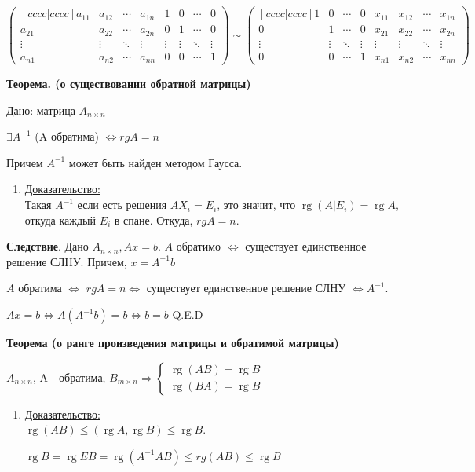 \documentclass[twoside]{book}
\DeclareMathOperator{\rg}{rg}
\newcommand{\prooff}[1]{{\underline{Доказательство:}} \\ }
\begin{document}
\(
\begin{pmatrix}[cccc|cccc]
    a_{11} & a_{12} & \cdots & a_{1n} & 1      & 0      & \cdots & 0      \\
    a_{21} & a_{22} & \cdots & a_{2n} & 0      & 1      & \cdots & 0      \\
    \vdots & \vdots & \ddots & \vdots & \vdots & \vdots & \ddots & \vdots \\
    a_{n1} & a_{n2} & \cdots & a_{nn} & 0      & 0      & \cdots & 1
\end{pmatrix} \sim
\begin{pmatrix}[cccc|cccc]
    1      & 0      & \cdots & 0      & x_{11} & x_{12} & \cdots & x_{1n} \\
    0      & 1      & \cdots & 0      & x_{21} & x_{22} & \cdots & x_{2n} \\
    \vdots & \vdots & \ddots & \vdots & \vdots & \vdots & \ddots & \vdots \\
    0      & 0      & \cdots & 1      & x_{n1} & x_{n2} & \cdots & x_{nn}
\end{pmatrix}
\)

\textbf{Теорема. (о существовании обратной матрицы)}

Дано: матрица \(A_{n \times n}\)

\(\exists A^{-1}\) (A обратима) \(\Leftrightarrow rg A = n\)

Причем \(A^{-1}\) может быть найден методом Гаусса.
\begin{enumerate}
    \item[] \prooff{}
          Такая $A^{-1}$ если есть решения $AX_i = E_i$, это значит, что $\rg(A|E_i) = \rg A$, откуда каждый $E_i$ в спане. Откуда, $rg A = n$.
\end{enumerate}

\textbf{Следствие}. Дано \(A_{n \times n}, Ax=b\). \(A\) обратимо \(\Leftrightarrow\) существует единственное решение СЛНУ. Причем, \(x = A^{-1} b\)

\(A\) обратима \(\Leftrightarrow\) \(rg A = n \Leftrightarrow\) существует единственное решение СЛНУ \(\Leftrightarrow A^{-1}\).

\(Ax = b \Leftrightarrow A (A^{-1}b) = b \Leftrightarrow b = b\) Q.E.D

\textbf{Теорема (о ранге произведения матрицы и обратимой матрицы)}

\(A_{n\times n}\), A - обратима, \(B_{m \times n} \Rightarrow
\begin{cases}
    \rg(AB) = \rg B \\
    \rg(BA) = \rg B
\end{cases}
\)
\begin{enumerate}
    \item[] \prooff{}
          $\rg(AB)\leq (\rg A, \rg B)\leq \rg B$.

          $\rg B = \rg EB = \rg (A^{-1}AB)\leq rg(AB) \leq \rg B$
\end{enumerate}
\end{document}
